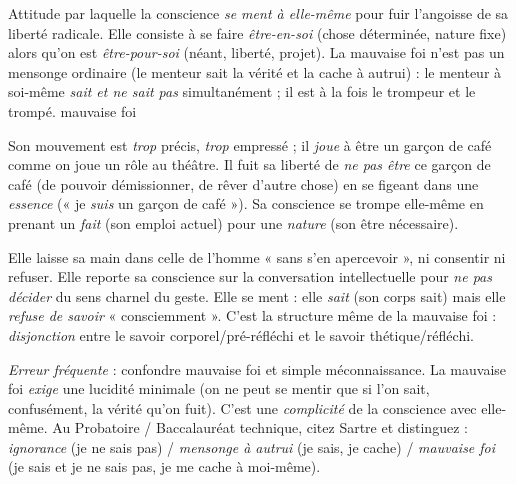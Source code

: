 \documentclass[11pt]{article}
\newcommand{\cle}[1]{{\popxbold\color{popdark}#1}}
\begin{document}
\begin{definition}
Attitude par laquelle la conscience \emph{se ment à elle-même} pour fuir l'angoisse de sa liberté radicale. Elle consiste à se faire \emph{être-en-soi} (chose déterminée, nature fixe) alors qu'on est \emph{être-pour-soi} (néant, liberté, projet). La mauvaise foi n'est pas un mensonge ordinaire (le menteur sait la vérité et la cache à autrui) : le menteur à soi-même \emph{sait et ne sait pas} simultanément ; il est à la fois le trompeur et le trompé. \cle{mauvaise foi}
\end{definition}

\begin{exemplebox}
Son mouvement est \emph{trop} précis, \emph{trop} empressé ; il \emph{joue} à être un garçon de café comme on joue un rôle au théâtre. Il fuit sa liberté de \emph{ne pas être} ce garçon de café (de pouvoir démissionner, de rêver d'autre chose) en se figeant dans une \emph{essence} (« je \emph{suis} un garçon de café »). Sa conscience se trompe elle-même en prenant un \emph{fait} (son emploi actuel) pour une \emph{nature} (son être nécessaire).
\end{exemplebox}

\begin{exemplebox}
Elle laisse sa main dans celle de l'homme « sans s'en apercevoir », ni consentir ni refuser. Elle reporte sa conscience sur la conversation intellectuelle pour \emph{ne pas décider} du sens charnel du geste. Elle se ment : elle \emph{sait} (son corps sait) mais elle \emph{refuse de savoir} « consciemment ». C'est la structure même de la mauvaise foi : \emph{disjonction} entre le savoir corporel/pré-réfléchi et le savoir thétique/réfléchi.
\end{exemplebox}

\begin{attention}
\emph{Erreur fréquente} : confondre mauvaise foi et simple méconnaissance. La mauvaise foi \emph{exige} une lucidité minimale (on ne peut se mentir que si l'on sait, confusément, la vérité qu'on fuit). C'est une \emph{complicité} de la conscience avec elle-même. Au Probatoire / Baccalauréat technique, citez Sartre et distinguez : \emph{ignorance} (je ne sais pas) / \emph{mensonge à autrui} (je sais, je cache) / \emph{mauvaise foi} (je sais et je ne sais pas, je me cache à moi-même).
\end{attention}
\end{document}

